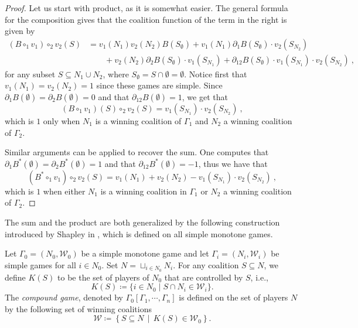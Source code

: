 \documentclass[a4paper,12pt]{amsart}
\begin{document}
\begin{proof}
Let us start with product, as it is somewhat easier. The general formula for the composition gives that the coalition function of the term in the right is given by 
\begin{align*}
(B \circ_1 v_1) \circ_2 v_2(S) & = v_1(N_1)v_2(N_2)B(S_{\emptyset}) + v_1(N_1)\partial_1 B(S_{\emptyset}) \cdot v_2(S_{N_2}) \\
& \qquad + v_2(N_2) \partial_2B(S_{\emptyset}) \cdot v_1(S_{N_1}) + \partial_{12} B(S_{\emptyset}) \cdot v_1(S_{N_1}) \cdot v_2(S_{N_2})~,
\end{align*}
for any subset $S \subseteq N_1 \cup N_2$, where $S_{\emptyset} = S \cap \emptyset = \emptyset$. Notice first that $v_1(N_1) = v_2(N_2) = 1$ since these games are simple. Since $\partial_1B(\emptyset) = \partial_2B(\emptyset) = 0$ and that $\partial_{12} B(\emptyset) = 1$, we get that 
\[
(B \circ_1 v_1)(S) \circ_2 v_2(S) = v_1(S_{N_1}) \cdot v_2(S_{N_2})~,
\]
which is $1$ only when $N_1$ is a winning coalition of $\Gamma_1$ and $N_2$ a winning coalition of $\Gamma_2$. 

\medskip

Similar arguments can be applied to recover the sum. One computes that $\partial_1 B^*(\emptyset) = \partial_2 B^*(\emptyset) = 1$ and that $\partial_{12}B^*(\emptyset) = -1$, thus we have that
\[
(B^* \circ_1 v_1) \circ_2 v_2(S) = v_1(N_1) + v_2(N_2) - v_1(S_{N_1}) \cdot v_2(S_{N_2})~,
\]
which is $1$ when either $N_1$ is a winning coalition in $\Gamma_1$ or $N_2$ a winning coalition of $\Gamma_2$. 
\end{proof}

The sum and the product are both generalized by the following construction introduced by Shapley in \cite{ShapleyCompoundII}, which is defined on all simple monotone games. 

\begin{definition}
Let \(\Gamma_0 = (N_0, \mathcal{W}_0)\) be a simple monotone game and let \(\Gamma_i = (N_i, \mathcal{W}_i)\) be simple games for all \(i \in N_0\). Set \(N = \sqcup_{i \in N_0} N_i\). For any coalition \(S \subseteq N\), we define \(K(S)\) to be the set of players of \(N_0\) that are controlled by \(S\), i.e., 
\[
K(S) \coloneqq \{i \in N_0 \mid S \cap N_i \in \mathcal{W}_i\}. 
\]
The \textit{compound game}, denoted by $\Gamma_0[\Gamma_1, \cdots, \Gamma_n ]$ is defined on the set of players $N$ by the following set of winning coalitions
\[
\mathcal{W} \coloneqq \left\{S \subseteq N ~~|~~ K(S) \in \mathcal{W}_0\right\}. 
\]
\end{definition}
\end{document}
